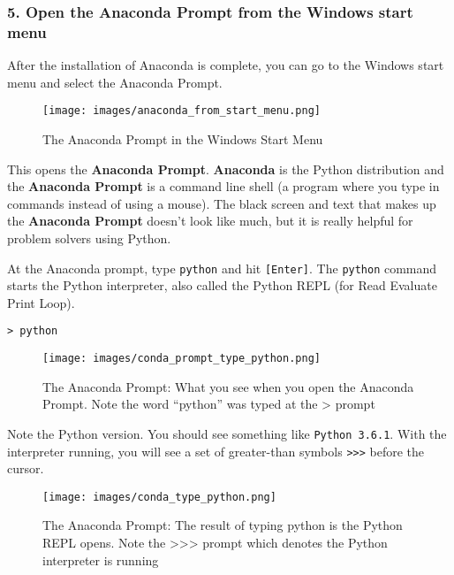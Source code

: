 \documentclass{book}
\makeatletter
\def\maxwidth{\ifdim\Gin@nat@width>\linewidth\linewidth
\else\Gin@nat@width\fi}
\let\Oldincludegraphics\includegraphics
\renewcommand{\includegraphics}[1]{\Oldincludegraphics[width=.8\maxwidth]{#1}}
\newcommand{\passthrough}[1]{#1}
\makeatother
\begin{document}
    
        \hypertarget{open-the-anaconda-prompt-from-the-windows-start-menu}{%
\subsubsection{5. Open the Anaconda Prompt from the Windows start
menu}\label{open-the-anaconda-prompt-from-the-windows-start-menu}}

After the installation of Anaconda is complete, you can go to the
Windows start menu and select the Anaconda Prompt.

\begin{figure}
\centering
\texttt{[image: images/anaconda\_from\_start\_menu.png]}
\caption{The Anaconda Prompt in the Windows Start Menu}
\end{figure}

This opens the \textbf{Anaconda Prompt}. \textbf{Anaconda} is the Python
distribution and the \textbf{Anaconda Prompt} is a command line shell (a
program where you type in commands instead of using a mouse). The black
screen and text that makes up the \textbf{Anaconda Prompt} doesn't look
like much, but it is really helpful for problem solvers using Python.

At the Anaconda prompt, type \passthrough{\lstinline!python!} and hit
\passthrough{\lstinline![Enter]!}. The \passthrough{\lstinline!python!}
command starts the Python interpreter, also called the Python REPL (for
Read Evaluate Print Loop).

\begin{lstlisting}
> python
\end{lstlisting}

\begin{figure}
\centering
\texttt{[image: images/conda\_prompt\_type\_python.png]}
\caption{The Anaconda Prompt: What you see when you open the Anaconda
Prompt. Note the word ``python'' was typed at the \textgreater{} prompt}
\end{figure}

Note the Python version. You should see something like
\passthrough{\lstinline!Python 3.6.1!}. With the interpreter running,
you will see a set of greater-than symbols \passthrough{\lstinline!>>>!}
before the cursor.

\begin{figure}
\centering
\texttt{[image: images/conda\_type\_python.png]}
\caption{The Anaconda Prompt: The result of typing python is the Python
REPL opens. Note the \textgreater{}\textgreater{}\textgreater{} prompt
which denotes the Python interpreter is running}
\end{figure}
\end{document}
